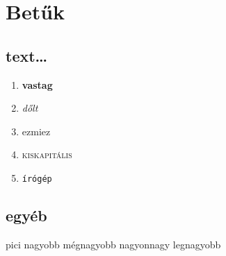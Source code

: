 \documentclass[a4papper, 12pt]{report}
\begin{document}
		\section{Betűk}
			\subsection{text\dots}
				\begin{enumerate}
					\item \textbf{vastag}
					\item \textit{dőlt}
					\item \textsf{ezmiez}
					\item \textsc{kiskapitális}
					\item \texttt{írógép}
				\end{enumerate}
			\subsection{egyéb}
			{\tiny pici}
			{\large nagyobb}
			{\Large mégnagyobb}
			{\huge nagyonnagy}
			{\Huge legnagyobb}
			
			
	
\end{document}
